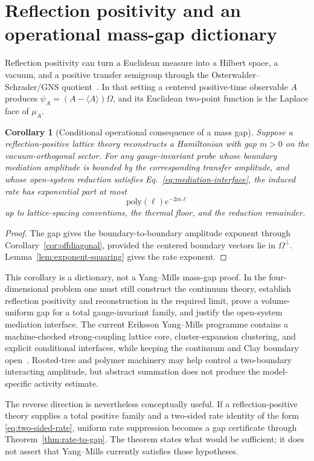 \documentclass[11pt,a4paper]{article}
\newtheorem{corollary}[theorem]{Corollary}
\theoremstyle{definition}
\theoremstyle{remark}
\begin{document}
\section{Reflection positivity and an operational mass-gap dictionary}
\label{sec:os}

Reflection positivity can turn a Euclidean measure into a Hilbert space, a
vacuum, and a positive transfer semigroup through the
Osterwalder--Schrader/GNS quotient~\cite{OS1973,OS1975,FILS1978}.  In that
setting a centered positive-time observable $A$ produces
$\psi_A=(A-\langle A\rangle)\Omega$, and its Euclidean two-point function is
the Laplace face of $\mu_A$.

\begin{corollary}[Conditional operational consequence of a mass gap]
\label{cor:ym-operational}
Suppose a reflection-positive lattice theory reconstructs a Hamiltonian with
gap $m>0$ on the vacuum-orthogonal sector.  For any gauge-invariant probe whose
boundary mediation amplitude is bounded by the corresponding transfer
amplitude, and whose open-system reduction satisfies
Eq.~\eqref{eq:mediation-interface}, the induced rate has exponential part at
most
\[
  \mathrm{poly}(\ell)e^{-2m\ell}
\]
up to lattice-spacing conventions, the thermal floor, and the reduction
remainder.
\end{corollary}

\begin{proof}
The gap gives the boundary-to-boundary amplitude exponent through
Corollary~\ref{cor:offdiagonal}, provided the centered boundary vectors lie in
$\Omega^\perp$.  Lemma~\ref{lem:exponent-squaring} gives the rate exponent.
\end{proof}

This corollary is a dictionary, not a Yang--Mills mass-gap proof.  In the
four-dimensional problem one must still construct the continuum theory,
establish reflection positivity and reconstruction in the required limit, prove a
volume-uniform gap for a total gauge-invariant family, and justify the
open-system mediation interface.  The current Eriksson Yang--Mills programme
contains a machine-checked strong-coupling lattice core, cluster-expansion
clustering, and explicit conditional interfaces, while keeping the continuum
and Clay boundary open~\cite{ErikssonProgramme}.  Rooted-tree and polymer
machinery may help control a two-boundary interacting amplitude, but abstract
summation does not produce the model-specific activity estimate.

The reverse direction is nevertheless conceptually useful.  If a
reflection-positive theory supplies a total positive family and a two-sided
rate identity of the form \eqref{eq:two-sided-rate}, uniform rate suppression
becomes a gap certificate through Theorem~\ref{thm:rate-to-gap}.  The theorem
states what would be sufficient; it does not assert that Yang--Mills currently
satisfies those hypotheses.
\end{document}
